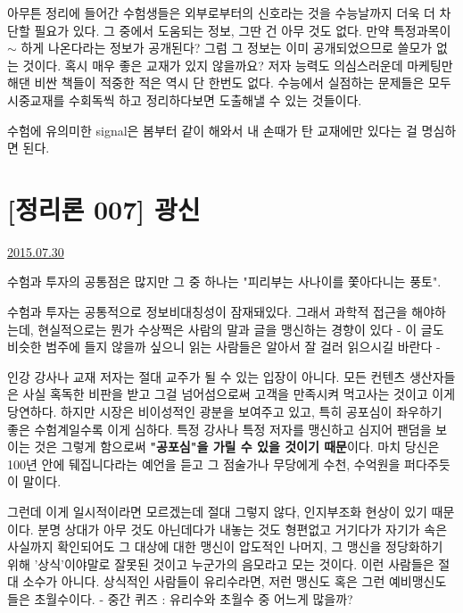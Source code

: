 아무튼 정리에 들어간 수험생들은 외부로부터의 신호라는 것을 수능날까지 더욱 더 차단할 필요가 있다.
그 중에서 도움되는 정보, 그딴 건 아무 것도 없다.
만약 특정과목이 $\sim$ 하게 나온다라는 정보가 공개된다? 그럼 그 정보는 이미 공개되었으므로 쓸모가 없는 것이다.
혹시 매우 좋은 교재가 있지 않을까요?
저자 능력도 의심스러운데 마케팅만 해댄 비싼 책들이 적중한 적은 역시 단 한번도 없다.
수능에서 실점하는 문제들은 모두 시중교재를 수회독씩 하고 정리하다보면 도출해낼 수 있는 것들이다.
\vspace{5mm}

수험에 유의미한 signal은 봄부터 같이 해와서 내 손때가 탄 교재에만 있다는 걸 명심하면 된다.
\vspace{5mm}






\section{[정리론 007] 광신}
\href{https://www.kockoc.com/Apoc/222317}{2015.07.30}

\vspace{5mm}

수험과 투자의 공통점은 많지만 그 중 하나는 "피리부는 사나이를 쫓아다니는 풍토".
\vspace{5mm}

수험과 투자는 공통적으로 정보비대칭성이 잠재돼있다.
그래서 과학적 접근을 해야하는데, 현실적으로는 뭔가 수상쩍은 사람의 말과 글을 맹신하는 경향이 있다
- 이 글도 비슷한 범주에 들지 않을까 싶으니 읽는 사람들은 알아서 잘 걸러 읽으시길 바란다 -
\vspace{5mm}

인강 강사나 교재 저자는 절대 교주가 될 수 있는 입장이 아니다.
모든 컨텐츠 생산자들은 사실 혹독한 비판을 받고 그걸 넘어섬으로써 고객을 만족시켜 먹고사는 것이고 이게 당연하다.
하지만 시장은 비이성적인 광분을 보여주고 있고, 특히 공포심이 좌우하기 좋은 수험계일수록 이게 심하다.
특정 강사나 특정 저자를 맹신하고 심지어 팬덤을 보이는 것은 그렇게 함으로써 \textbf{"공포심"을 가릴 수 있을 것이기 때문}이다.
마치 당신은 100년 안에 뒈집니다라는 예언을 듣고 그 점술가나 무당에게 수천, 수억원을 퍼다주듯이 말이다.
\vspace{5mm}

그런데 이게 일시적이라면 모르겠는데 절대 그렇지 않다,
인지부조화 현상이 있기 때문이다.
분명 상대가 아무 것도 아닌데다가 내놓는 것도 형편없고 거기다가 자기가 속은 사실까지 확인되어도
그 대상에 대한 맹신이 압도적인 나머지, 그 맹신을 정당화하기 위해 '상식'이야말로 잘못된 것이고 누군가의 음모라고 모는 것이다.
이런 사람들은 절대 소수가 아니다.
상식적인 사람들이 유리수라면, 저런 맹신도 혹은 그런 예비맹신도들은 초월수이다.
- 중간 퀴즈 : 유리수와 초월수 중 어느게 많을까?
\vspace{5mm}

